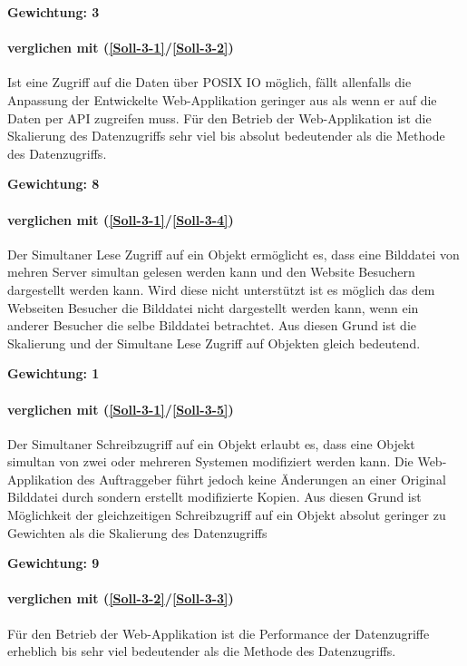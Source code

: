 \textbf{Gewichtung: 3}

\paragraph*{ verglichen mit  (\ref{Soll-3-1}/\ref{Soll-3-2})}
Ist eine Zugriff auf die Daten über POSIX IO möglich, fällt allenfalls die Anpassung der Entwickelte Web-Applikation geringer aus als wenn er auf die Daten per API zugreifen muss. Für den Betrieb der Web-Applikation ist die Skalierung des Datenzugriffs sehr viel bis absolut bedeutender als die Methode des Datenzugriffs.

\textbf{Gewichtung: 8}


\paragraph*{ verglichen mit  (\ref{Soll-3-1}/\ref{Soll-3-4})}
Der Simultaner Lese Zugriff auf ein Objekt ermöglicht es, dass eine Bilddatei von mehren Server simultan gelesen werden kann und den Website Besuchern dargestellt werden kann. Wird diese nicht unterstützt ist es möglich das dem Webseiten Besucher die Bilddatei nicht dargestellt werden kann, wenn ein anderer Besucher die selbe Bilddatei betrachtet. Aus diesen Grund ist die Skalierung und der Simultane Lese Zugriff auf Objekten gleich bedeutend.

\textbf{Gewichtung: 1}


\paragraph*{ verglichen mit  (\ref{Soll-3-1}/\ref{Soll-3-5})}
Der Simultaner Schreibzugriff auf ein Objekt erlaubt es, dass eine Objekt simultan von zwei oder mehreren Systemen modifiziert werden kann. Die Web-Applikation des Auftraggeber führt jedoch keine Änderungen an einer Original Bilddatei durch sondern erstellt modifizierte Kopien. Aus diesen Grund ist Möglichkeit der gleichzeitigen Schreibzugriff auf ein Objekt absolut geringer zu Gewichten als die Skalierung des Datenzugriffs

\textbf{Gewichtung: 9}

\paragraph*{ verglichen mit  (\ref{Soll-3-2}/\ref{Soll-3-3})}
Für den Betrieb der Web-Applikation ist die Performance der Datenzugriffe erheblich bis sehr viel bedeutender als die Methode des Datenzugriffs.

